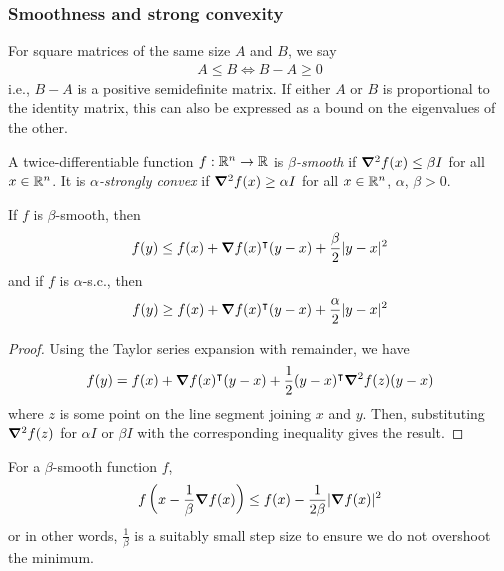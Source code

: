 \documentclass{../template/note}
\begin{document}
    \subsubsection{Smoothness and strong convexity}

    \begin{definition}
        For square matrices of the same size $A$ and $B$, we say
        \begin{align*}
            A \leq B \iff B - A \geq 0
        \end{align*}
        i.e., $B-A$ is a positive semidefinite matrix. If either $A$ or $B$ is proportional to the identity matrix, this can also be expressed as a bound on the eigenvalues of the other.        
    \end{definition}    

    \begin{definition}
        A twice-differentiable function $f: \mathbb R^n \to \mathbb R$ is \emph{$\beta$-smooth} if $\grad^2 f(x) \leq \beta I$ for all $x \in \mathbb R^n$. It is \emph{$\alpha$-strongly convex} if $\grad^2 f(x) \geq \alpha I$ for all $x \in \mathbb R^n$, $\alpha$, $\beta > 0$.
    \end{definition}
    
    \begin{theorem}
        If $f$ is $\beta$-smooth, then
        \begin{align*}
            f(y) \leq f(x) + \grad f(x)^\intercal (y-x) + \frac \beta 2 |y-x|^2
        \end{align*}
        and if $f$ is $\alpha$-s.c., then
        \begin{align*}
            f(y) \geq f(x) + \grad f(x)^\intercal (y-x) + \frac \alpha 2 |y-x|^2
        \end{align*}
    \end{theorem}
    
    \begin{proof}
        Using the Taylor series expansion with remainder, we have
        \begin{align*}
            f(y) = f(x) + \grad f(x)^\intercal (y-x) + \frac 1 2 (y-x)^\intercal \grad^2f(z)(y-x)
        \end{align*}
        where $z$ is some point on the line segment joining $x$ and $y$. Then, substituting $\grad^2 f(z)$ for $\alpha I$ or $\beta I$ with the corresponding inequality gives the result.        
    \end{proof}
    
    \begin{corollary}
        \label{beta-smooth-bound}
        For a $\beta$-smooth function $f$,
        \begin{align*}
            f\left(x - \frac 1 \beta \grad f(x)\right) \leq f(x) - \frac 1 {2\beta} |\grad f(x)|^2 
        \end{align*}
        or in other words, $\frac 1 \beta$ is a suitably small step size to ensure we do not overshoot the minimum.        
    \end{corollary}
    
\end{document}
